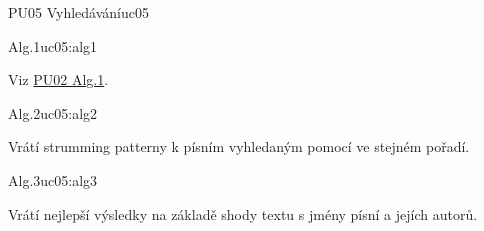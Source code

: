 \begin{usecase}{PU05 Vyhledávání}{uc05}
    \begin{scenario}{Alg.1}{uc05:alg1}
        \item Viz \hyperref[uc02:alg1]{PU02 Alg.1}.
    \end{scenario}

    \begin{scenario}{Alg.2}{uc05:alg2}
        \item Vrátí strumming patterny k písním vyhledaným pomocí  ve stejném pořadí.
    \end{scenario}

    \begin{scenario}{Alg.3}{uc05:alg3}
        \item Vrátí nejlepší výsledky na základě shody textu s jmény písní a jejích autorů.
    \end{scenario}
\end{usecase}

